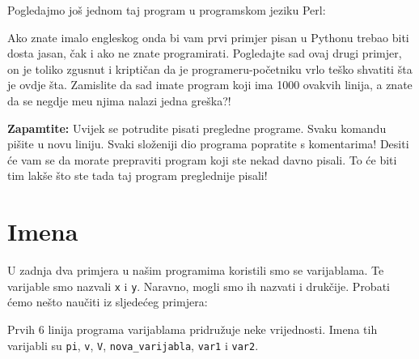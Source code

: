 	Pogledajmo jo\v{s} jednom taj program u programskom jeziku Perl:


	Ako znate imalo engleskog onda bi vam prvi primjer pisan u Pythonu trebao biti
	dosta jasan, \v{c}ak i ako ne znate programirati. Pogledajte sad ovaj drugi
	primjer, on je toliko zgusnut i kripti\v{c}an da je programeru-po\v{c}etniku vrlo
	te\v{s}ko shvatiti \v{s}ta je ovdje \v{s}ta. Zamislite da sad imate program koji
	ima 1000 ovakvih linija, a znate da se negdje me\dj{}u njima nalazi jedna
	gre\v{s}ka?!

	\textbf{Zapamtite:} Uvijek se potrudite pisati pregledne programe. Svaku komandu
	pi\v{s}ite u novu liniju. Svaki slo\v{z}eniji dio programa popratite s komentarima!
	Desiti \'{c}e vam se da morate prepraviti program koji ste nekad davno pisali. To
	\'{c}e biti tim lak\v{s}e \v{s}to ste tada taj program preglednije pisali!
	
\section{Imena}

	U zadnja dva primjera u na\v{s}im programima koristili smo se varijablama. Te
	varijable smo nazvali \verb+x+ i \verb+y+. Naravno, mogli smo ih nazvati i
	druk\v{c}ije. Probati \'{c}emo ne\v{s}to nau\v{c}iti iz sljede\'{c}eg primjera:


	Prvih 6 linija programa varijablama pridru\v{z}uje neke vrijednosti. Imena tih
	varijabli su 
	\verb+pi+,
	\verb+v+,
	\verb+V+,
	\verb+nova_varijabla+,
	\verb+var1+ i 
	\verb+var2+.

